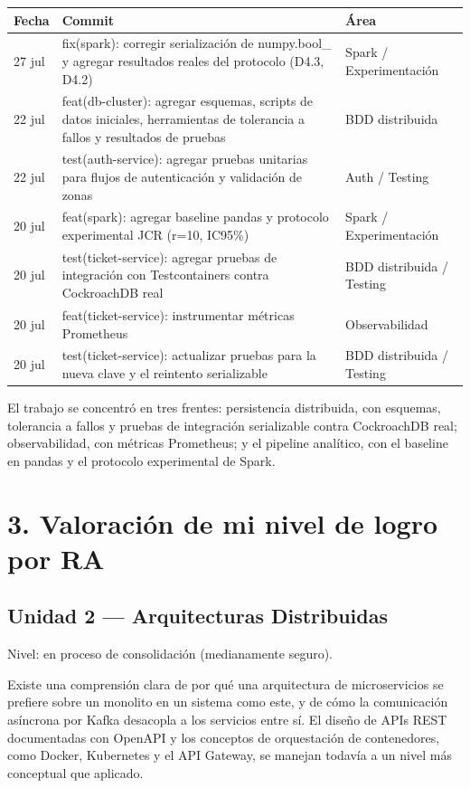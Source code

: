 \documentclass[12pt]{article}
\begin{document}
\begin{longtable}{@{}p{2cm}p{9.8cm}p{2.2cm}@{}}
Fecha & Commit & Área \\
\hline
\endhead
27 jul & fix(spark): corregir serialización de numpy.bool\_ y agregar resultados reales del protocolo (D4.3, D4.2) & Spark / Experimentación \\
22 jul & feat(db-cluster): agregar esquemas, scripts de datos iniciales, herramientas de tolerancia a fallos y resultados de pruebas & BDD distribuida \\
22 jul & test(auth-service): agregar pruebas unitarias para flujos de autenticación y validación de zonas & Auth / Testing \\
20 jul & feat(spark): agregar baseline pandas y protocolo experimental JCR (r=10, IC95\%) & Spark / Experimentación \\
20 jul & test(ticket-service): agregar pruebas de integración con Testcontainers contra CockroachDB real & BDD distribuida / Testing \\
20 jul & feat(ticket-service): instrumentar métricas Prometheus & Observabilidad \\
20 jul & test(ticket-service): actualizar pruebas para la nueva clave y el reintento serializable & BDD distribuida / Testing \\
\end{longtable}

El trabajo se concentró en tres frentes: persistencia distribuida, con esquemas, tolerancia a fallos y pruebas de integración serializable contra CockroachDB real; observabilidad, con métricas Prometheus; y el pipeline analítico, con el baseline en pandas y el protocolo experimental de Spark.

\section*{3. Valoración de mi nivel de logro por RA}

\subsection*{Unidad 2 --- Arquitecturas Distribuidas}
Nivel: en proceso de consolidación (medianamente seguro).

Existe una comprensión clara de por qué una arquitectura de microservicios se prefiere sobre un monolito en un sistema como este, y de cómo la comunicación asíncrona por Kafka desacopla a los servicios entre sí. El diseño de APIs REST documentadas con OpenAPI y los conceptos de orquestación de contenedores, como Docker, Kubernetes y el API Gateway, se manejan todavía a un nivel más conceptual que aplicado.
\end{document}
